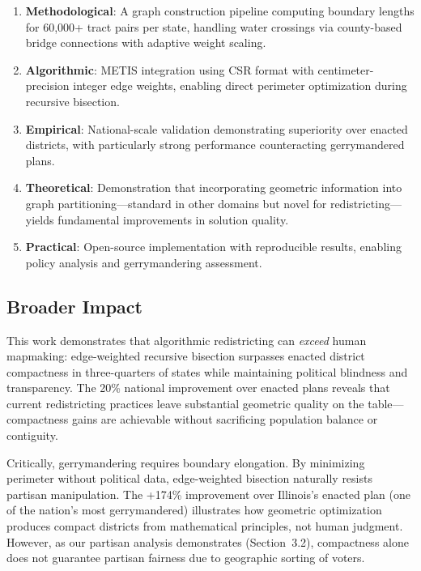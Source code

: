 \begin{enumerate}
    \item \textbf{Methodological}: A graph construction pipeline computing boundary lengths for 60,000+ tract pairs per state, handling water crossings via county-based bridge connections with adaptive weight scaling.

    \item \textbf{Algorithmic}: METIS integration using CSR format with centimeter-precision integer edge weights, enabling direct perimeter optimization during recursive bisection.

    \item \textbf{Empirical}: National-scale validation demonstrating superiority over enacted districts, with particularly strong performance counteracting gerrymandered plans.

    \item \textbf{Theoretical}: Demonstration that incorporating geometric information into graph partitioning—standard in other domains but novel for redistricting—yields fundamental improvements in solution quality.

    \item \textbf{Practical}: Open-source implementation with reproducible results, enabling policy analysis and gerrymandering assessment.
\end{enumerate}

\subsection{Broader Impact}

This work demonstrates that algorithmic redistricting can \textit{exceed} human mapmaking: edge-weighted recursive bisection surpasses enacted district compactness in three-quarters of states while maintaining political blindness and transparency. The 20\% national improvement over enacted plans reveals that current redistricting practices leave substantial geometric quality on the table—compactness gains are achievable without sacrificing population balance or contiguity.

Critically, gerrymandering requires boundary elongation. By minimizing perimeter without political data, edge-weighted bisection naturally resists partisan manipulation. The +174\% improvement over Illinois's enacted plan (one of the nation's most gerrymandered) illustrates how geometric optimization produces compact districts from mathematical principles, not human judgment. However, as our partisan analysis demonstrates (Section~3.2), compactness alone does not guarantee partisan fairness due to geographic sorting of voters.

